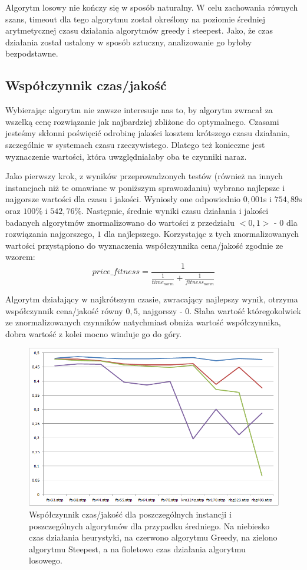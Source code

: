Algorytm losowy nie kończy się w sposób naturalny. W celu zachowania równych szans, timeout dla tego algorytmu został określony na poziomie średniej arytmetycznej czasu działania algorytmów greedy i steepest. Jako, że czas działania został ustalony w sposób sztuczny, analizowanie go byłoby bezpodstawne.

\subsection{Współczynnik czas/jakość}
Wybierając algorytm nie zawsze interesuje nas to, by algorytm zwracał za wszelką cenę rozwiązanie jak najbardziej zbliżone do optymalnego. Czasami jesteśmy skłonni poświęcić odrobinę jakości kosztem krótszego czasu działania, szczególnie w systemach czasu rzeczywistego. Dlatego też konieczne jest wyznaczenie wartości, która uwzględniałaby oba te czynniki naraz.

Jako pierwszy krok, z wyników przeprowadzonych testów (również na innych instancjach niż te omawiane w poniższym sprawozdaniu) wybrano najlepsze i najgorsze wartości dla czasu i jakości. Wyniosły one odpowiednio $0,001$s i $754,89$s oraz $100\%$ i $542,76\%$. Następnie, średnie wyniki czasu działania i jakości badanych algorytmów znormalizowano do wartości z przedziału $<0,1>$ - $0$ dla rozwiązania najgorszego, $1$ dla najlepszego. Korzystając z tych znormalizowanych wartości przystąpiono do wyznaczenia współczynnika cena/jakość zgodnie ze wzorem:
\begin{equation*}
price\_fitness = \frac{1}{\frac{1}{time_{norm}} + \frac{1}{fitness_{norm}} }
\end{equation*}

Algorytm działający w najkrótszym czasie, zwracający najlepszy wynik, otrzyma współczynnik cena/jakość równy $0,5$, najgorszy - $0$. Słaba wartość któregokolwiek ze znormalizowanych czynników natychmiast obniża wartość współczynnika, dobra wartość z kolei mocno winduje go do góry.

\begin{figure}[!h]
\centering\includegraphics[width=12cm]{img/jakosc-czas}
\caption{Współczynnik czas/jakość dla poszczególnych instancji i poszczególnych algorytmów dla przypadku średniego. Na niebiesko czas działania heurystyki, na czerwono algorytmu Greedy, na zielono algorytmu Steepest, a na fioletowo czas działania algorytmu losowego.}\label{rys:czas_jakosc}
\end{figure}

